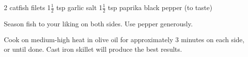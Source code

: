 \dishtype{\main}
\dishother{}
\begin{ingreds}
    2 catfish filets
    1$\frac{1}{2}$ tsp garlic salt
    1$\frac{1}{2}$ tsp paprika  
    black pepper (to taste)  
\end{ingreds}
\begin{method}
    Season fish to your liking on both sides. Use pepper generously.\par
    Cook on medium-high heat in olive oil for approximately 3 minutes on each side, or until done. Cast iron skillet will produce the best results. 
\end{method}